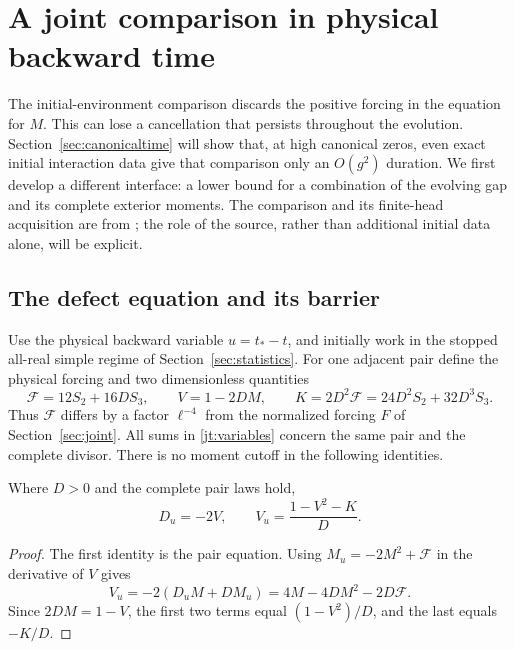 \section{A joint comparison in physical backward time}
\label{sec:jointtime}

The initial-environment comparison discards the positive forcing in the
equation for $M$. This can lose a cancellation that persists throughout
the evolution. Section~\ref{sec:canonicaltime} will show that, at high
canonical zeros, even exact initial interaction data give that comparison
only an $O(g^2)$ duration. We first develop a different interface: a lower
bound for a combination of the evolving gap and its complete exterior
moments. The comparison and its finite-head acquisition are from
\cite{BakerCM23,BakerCM25}; the role of the source, rather than additional
initial data alone, will be explicit.

\subsection{The defect equation and its barrier}

Use the physical backward variable $u=t_*-t$, and initially work in the
stopped all-real simple regime of Section~\ref{sec:statistics}. For one
adjacent pair define the physical forcing and two dimensionless quantities
\begin{equation}
 \mathcal F=12S_2+16DS_3,\qquad
 V=1-2DM,\qquad
 K=2D^2\mathcal F=24D^2S_2+32D^3S_3.
 \label{jt:variables}
\end{equation}
Thus $\mathcal F$ differs by a factor $\ell^{-4}$ from the normalized
forcing $F$ of Section~\ref{sec:joint}. All sums in
\eqref{jt:variables} concern the same pair and the complete divisor.
There is no moment cutoff in the following identities.

\begin{proposition}
\label{jt:defect}
Where $D>0$ and the complete pair laws hold,
\begin{equation}
 D_u=-2V,\qquad V_u=\frac{1-V^2-K}{D}.
 \label{jt:system}
\end{equation}
\end{proposition}

\begin{proof}
The first identity is the pair equation. Using
$M_u=-2M^2+\mathcal F$ in the derivative of $V$ gives
\[
 V_u=-2(D_uM+DM_u)=4M-4DM^2-2D\mathcal F.
\]
Since $2DM=1-V$, the first two terms equal $(1-V^2)/D$,
and the last equals $-K/D$.
\end{proof}

